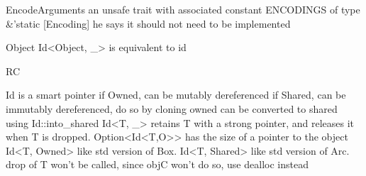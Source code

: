 EncodeArguments
an unsafe trait with associated constant ENCODINGS of type &'static [Encoding]
he says it should not need to be implemented


Object
Id<Object, _> is equivalent to id


RC

Id is a smart pointer
if Owned, can be mutably dereferenced
if Shared, can be immutably dereferenced, do so by cloning
owned can be converted to shared using Id::into_shared
Id<T, _> retains T with a strong pointer, and releases it when T is dropped.
Option<Id<T,O>> has the size of a pointer to the object
Id<T, Owned> like std version of Box. 
Id<T, Shared> like std version of Arc. 
drop of T won't be called, since objC won't do so, use dealloc instead







